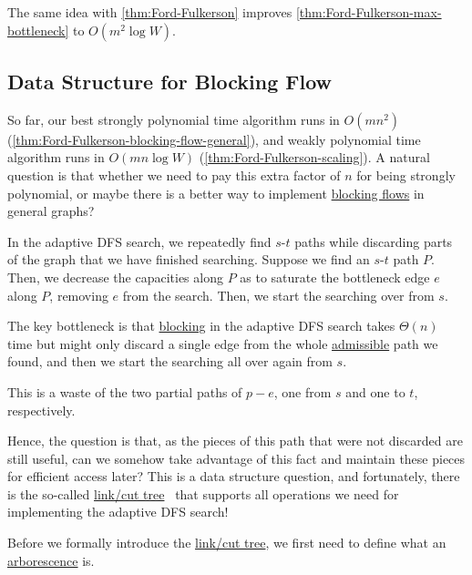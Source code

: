 \begin{remark}
	The same idea with \autoref{thm:Ford-Fulkerson} improves \autoref{thm:Ford-Fulkerson-max-bottleneck} to \(O(m^2 \log W)\).
\end{remark}

\subsection{Data Structure for Blocking Flow}
So far, our best strongly polynomial time algorithm runs in \(O(mn^2)\) (\autoref{thm:Ford-Fulkerson-blocking-flow-general}), and weakly polynomial time algorithm runs in \(O(mn \log W)\) (\autoref{thm:Ford-Fulkerson-scaling}). A natural question is that whether we need to pay this extra factor of \(n\) for being strongly polynomial, or maybe there is a better way to implement \hyperref[def:blocking-flow]{blocking flows} in general graphs?

\begin{prev}
	In the adaptive DFS search, we repeatedly find \(s\)-\(t\) paths while discarding parts of the graph that we have finished searching. Suppose we find an \(s\)-\(t\) path \(P\). Then, we decrease the capacities along \(P\) as to saturate the bottleneck edge \(e\) along \(P\), removing \(e\) from the search. Then, we start the searching over from \(s\).
\end{prev}

The key bottleneck is that \hyperref[algo:general-adaptive-DFS-block]{blocking} in the adaptive DFS search takes \(\Theta (n)\) time but might only discard a single edge from the whole \hyperref[def:admissible]{admissible} path we found, and then we start the searching all over again from \(s\).

\begin{intuition}
	This is a waste of the two partial paths of \(p-e\), one from \(s\) and one to \(t\), respectively.
\end{intuition}

Hence, the question is that, as the pieces of this path that were not discarded are still useful, can we somehow take advantage of this fact and maintain these pieces for efficient access later? This is a data structure question, and fortunately, there is the so-called \hyperref[def:link-cut-tree]{link/cut tree}~\cite{sleator1985self} that supports all operations we need for implementing the adaptive DFS search!

Before we formally introduce the \hyperref[def:link-cut-tree]{link/cut tree}, we first need to define what an \hyperref[def:arborescence]{arborescence} is.

